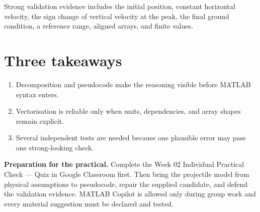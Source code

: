 \documentclass[11pt,a4paper]{article}
\begin{document}
Strong validation evidence includes the initial position, constant horizontal velocity, the sign change of vertical velocity at the peak, the final ground condition, a reference range, aligned arrays, and finite values.

\section*{Three takeaways}
\begin{enumerate}[nosep,leftmargin=6mm]
  \item Decomposition and pseudocode make the reasoning visible before MATLAB syntax enters.
  \item Vectorisation is reliable only when units, dependencies, and array shapes remain explicit.
  \item Several independent tests are needed because one plausible error may pass one strong-looking check.
\end{enumerate}

\begin{keybox}
\textbf{Preparation for the practical.} Complete the Week 02 Individual Practical Check --- Quiz in Google Classroom first. Then bring the projectile model from physical assumptions to pseudocode, repair the supplied candidate, and defend the validation evidence. MATLAB Copilot is allowed only during group work and every material suggestion must be declared and tested.
\end{keybox}
\end{document}
